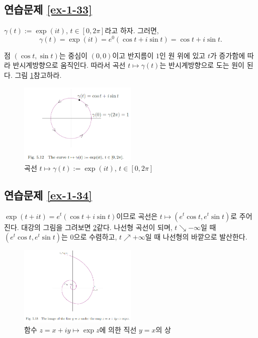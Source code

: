 \subsection*{연습문제 \ref{ex-1-33}}

$\gamma(t):= \exp(it)$, $t\in[0,2\pi]$라고 하자. 그러면,
\[
\gamma(t) = \exp(it) = e^0\left(\cos t + i\sin t\right) 
= \cos t + i\sin t.
\]

점 $(\cos t, \sin t)$는 중심이 $(0,0)$이고 반지름이 $1$인 원 위에 있고
$t$가 증가함에 따라 반시계방향으로 움직인다.
따라서 곡선 $t\mapsto \gamma(t)$는 반시계방향으로 도는 원이 된다.
그림 \ref{fig-5-12}\를 참고하라.

\begin{figure}[h!]
\begin{center}
\includegraphics[width=0.5\textwidth]{./figs/fig-5-12}
\end{center}
\caption{곡선 $t\mapsto \gamma(t):=\exp(it)$, $t\in[0,2\pi]$
}
\label{fig-5-12}
\end{figure}

\subsection*{연습문제 \ref{ex-1-34}}

$\exp(t+it) = e^t(\cos t + i\sin t)$이므로
곡선은 $t\mapsto (e^t\cos t, e^t\sin t)$로 주어진다.
대강의 그림을 그려보면 \ref{fig-5-13}\와 같다.
나선형 곡선이 되며, $t\searrow -\infty$일 때
$(e^t\cos t, e^t\sin t)$는 $0$으로 수렴하고,
$t\nearrow +\infty$일 때 나선형의 바깥으로 발산한다.

\begin{figure}[h!]
\begin{center}
\includegraphics[width=0.5\textwidth]{./figs/fig-5-13}
\end{center}
\caption{함수 $z=x+iy \mapsto \exp z$에 의한 직선 $y=x$의 상
}
\label{fig-5-13}
\end{figure}

